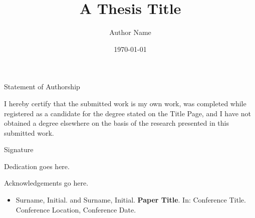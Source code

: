 \documentclass[british,a4paper,12pt]{phdthesis}
\title{A Thesis Title}
\author{Author Name}
\date{\today}
\begin{document}
\maketitle

\tableofcontents
\listoftables
\listoffigures

\printglossaries

%

\begin{dedication}

Statement of Authorship

I hereby certify that the submitted work is my own work, was completed while registered as a candidate for the degree stated on the Title Page, and I have not obtained a degree elsewhere on the basis of the research presented in this submitted work.

\vspace{5 cm}

Signature\hspace{0.5cm} \makebox[2in]{\hrulefill}

\end{dedication}

\begin{dedication}

Dedication goes here. 

\end{dedication}


\begin{acknowledgements}

Acknowledgements go here.  

\end{acknowledgements}


\newpage


\begin{listofpublications}
\label{listofpublications}

\begin{itemize}

\item Surname, Initial. and Surname, Initial. \textbf{Paper Title}. In: Conference Title. Conference Location, Conference Date. 

\end{itemize}

\end{listofpublications}
\end{document}
